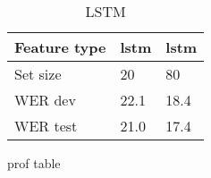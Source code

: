 \begin{center}
\begin{table}[h!]
\centering
\begin{tabular}{ lll } 
\toprule
 Feature type & lstm & lstm \\ 
\midrule
Set size & 20 & 80 \\
WER dev & 22.1 & 18.4 \\
WER test & 21.0 & 17.4 \\
 \bottomrule
\end{tabular} 
\caption{LSTM}
\label{tab:lstm_scores}
\end{table}

\end{center}

\begin{tabpo}[hello]
prof table \\
\end{tabpo}

